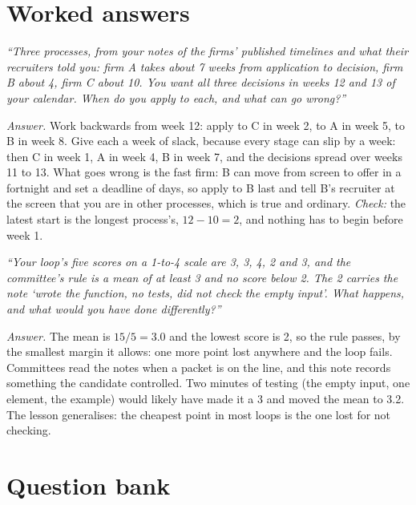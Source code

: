 \section{Worked answers}

\begin{example}\label{ex:iv:the-process-by-firm-type:align}
\emph{``Three processes, from your notes of the firms' published timelines and what their recruiters told you: firm A
takes about 7 weeks from application to decision, firm B about 4, firm C about 10. You want all three decisions in weeks
12 and 13 of your calendar. When do you apply to each, and what can go wrong?''}

\emph{Answer.} Work backwards from week 12: apply to C in week 2, to A in week 5, to B in week 8. Give each a week of
slack, because every stage can slip by a week: then C in week 1, A in week 4, B in week 7, and the decisions spread over
weeks 11 to 13. What goes wrong is the fast firm: B can move from screen to offer in a fortnight and set a deadline of
days, so apply to B last and tell B's recruiter at the screen that you are in other processes, which is true and
ordinary. \emph{Check:} the latest start is the longest process's, $12 - 10 = 2$, and nothing has to begin before
week 1.
\end{example}

\begin{example}\label{ex:iv:the-process-by-firm-type:packet}
\emph{``Your loop's five scores on a 1-to-4 scale are 3, 3, 4, 2 and 3, and the committee's rule is a mean of at least 3
and no score below 2. The 2 carries the note `wrote the function, no tests, did not check the empty input'. What happens,
and what would you have done differently?''}

\emph{Answer.} The mean is $15/5 = 3.0$ and the lowest score is 2, so the rule passes, by the smallest margin it allows:
one more point lost anywhere and the loop fails. Committees read the notes when a packet is on the line, and this note
records something the candidate controlled. Two minutes of testing (the empty input, one element, the example) would
likely have made it a 3 and moved the mean to 3.2. The lesson generalises: the cheapest point in most loops is the one
lost for not checking.
\end{example}

\section{Question bank}

